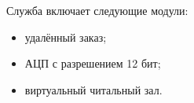 Служба включает следующие модули:

\begin{itemize}
  \item удалённый заказ;
  \item АЦП с разрешением 12 бит;
  \item виртуальный читальный зал.
\end{itemize}
